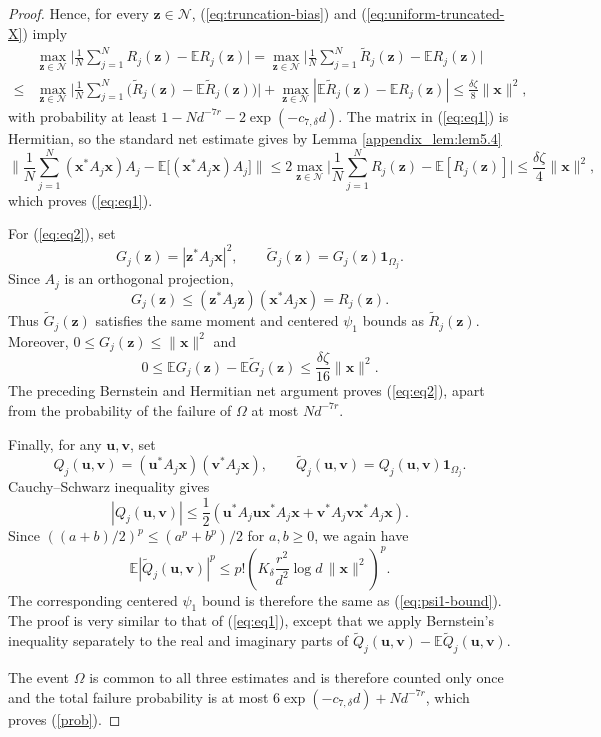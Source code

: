 \documentclass{article}
\renewcommand{\eqref}[1]{(\ref{#1})}
\newcommand{\E}{{\mathbb E}}
\newcommand{\vx}{{\mathbf x}}
\newcommand{\vz}{{\mathbf z}}
\newcommand{\vv}{{\mathbf v}}
\newcommand{\vu}{{\mathbf u}}
\newcommand{\0}{{\mathbf 0}}
\numberwithin{equation}{section}
\begin{document}
\begin{proof}
		Hence, for every
		$\vz\in\mathcal N$,  \eqref{eq:truncation-bias}
		and \eqref{eq:uniform-truncated-X} imply	    	\begin{align*}
			&\max_{\vz\in\mathcal N}\Big|\frac1N\sum_{j=1}^NR_j(\vz)-\E R_j(\vz)\Big|=\max_{\vz\in\mathcal N}\Big|\frac1N\sum_{j=1}^N\widetilde R_j(\vz)-\E R_j(\vz)\Big|\\
			\le&
			\max_{\vz\in\mathcal N}\Big|\frac1N\sum_{j=1}^N
			\bigl(\widetilde R_j(\vz)-\E\widetilde R_j(\vz)\bigr)\Big|+
			\max_{\vz\in\mathcal N}\left|\E\widetilde R_j(\vz)-\E R_j(\vz)\right|
			\le\frac{\delta\zeta}{8}\|\vx\|^2,
		\end{align*}
		with probability at least $1-Nd^{-7r}-2\exp(-c_{7,\delta}d)$.  
		The matrix in \eqref{eq:eq1} is Hermitian, so the standard net
		estimate gives by 
		Lemma \ref{appendix_lem:lem5.4}
		\[
		\Big\|\frac1N\sum_{j=1}^N(\vx^*A_j\vx)A_j
		-\E\big[(\vx^*A_j\vx)A_j\big]\Big\|
		\le2\max_{\vz\in\mathcal N}
		\Big|\frac1N\sum_{j=1}^NR_j(\vz)-\E [R_j(\vz)]\Big|\le\frac{\delta\zeta}{4}\|\vx\|^2,
		\]
		which proves \eqref{eq:eq1}.
		
		For \eqref{eq:eq2}, set
		\[
		G_j(\vz)=|\vz^*A_j\vx|^2,
		\qquad
		\widetilde G_j(\vz)=G_j(\vz)\mathbf1_{\Omega_j}. 
		\]
		Since $A_j$ is an orthogonal projection,
		\[
		G_j(\vz)
		\le(\vz^*A_j\vz)(\vx^*A_j\vx)=R_j(\vz).
		\]
		Thus $\widetilde G_j(\vz)$ satisfies the same moment and centered
		$\psi_1$ bounds as $\widetilde R_j(\vz)$. Moreover,
		$0\le G_j(\vz)\le\|\vx\|^2$ and 
		\[
		0\le\E G_j(\vz)-\E\widetilde G_j(\vz)
		\le\frac{\delta\zeta}{16}\|\vx\|^2.
		\]
		The preceding Bernstein and Hermitian net argument proves
		\eqref{eq:eq2}, apart from the probability of the failure of $\Omega$ at most $Nd^{-7r}$.
		
		Finally, for any $\vu,\vv$, set
		\[
		Q_j(\vu,\vv)=(\vu^*A_j\vx)(\vv^*A_j\vx),
		\qquad
		\widetilde Q_j(\vu,\vv)
		=Q_j(\vu,\vv)\mathbf1_{\Omega_j}.
		\]
		Cauchy--Schwarz inequality gives
		\[
		|Q_j(\vu,\vv)|
		\le\frac12
		(\vu^*A_j\vu\vx^*A_j\vx+\vv^*A_j\vv\vx^*A_j\vx).
		\]
		Since $((a+b)/2)^p\le(a^p+b^p)/2$ for $a,b\ge0$, we again have
		\[
		\E|\widetilde Q_j(\vu,\vv)|^p
		\le p!\left(
		K_\delta\frac{r^2}{d^2}\log d\,\|\vx\|^2
		\right)^p.
		\]
		The corresponding centered $\psi_1$ bound is therefore the same as \eqref{eq:psi1-bound}.
		The proof is very similar to that of \eqref{eq:eq1}, except that we apply Bernstein's inequality separately to the real and imaginary parts of $\widetilde Q_j(\vu,\vv)-\mathbb E\widetilde Q_j(\vu,\vv)$.
		
		The event $\Omega$ is common to all three estimates and is therefore
		counted only once and 
		the total failure probability is at most $
		6\exp(-c_{7,\delta} d)+Nd^{-7r}$, 
		which proves \eqref{prob}.
	\end{proof}
	
\end{document}
